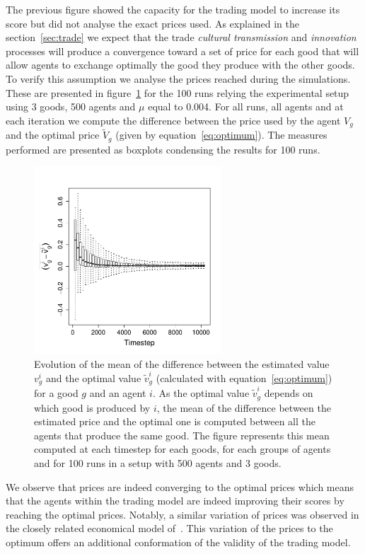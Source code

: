 \documentclass{wscpaperproc}
\begin{document}
The previous figure showed the capacity for the trading model to increase its score but did not analyse the exact prices used. As explained in the section~\ref{sec:trade} we expect that the trade \emph{cultural transmission} and \emph{innovation} processes will produce a convergence toward a set of price for each good that will allow agents to exchange optimally the good they produce with the other goods. To verify this assumption we analyse the prices reached during the simulations. These are presented in figure~\ref{fig:ratioEvol} for the 100 runs relying the experimental setup using 3 goods, 500 agents and $\mu$ equal to 0.004. For all runs, all agents and at each iteration we compute the difference between the price used by the agent $V_g$ and the optimal price $\tilde{V}_g$ (given by equation~\ref{eq:optimum}). The measures performed are presented as boxplots condensing the results for 100 runs.

\begin{figure}[!h]
	\begin{center}
		\includegraphics[width=7cm]{img/ClearingPriceDistanceEvolutionForTrade-G3N500.pdf}
	\end{center}
	\caption{Evolution of the mean of the difference between the estimated value $v^i_g$ and the optimal value $\tilde{v}^i_g$ (calculated with equation~\ref{eq:optimum}) for a good $g$ and an agent $i$. As the optimal value $\tilde{v}^i_g$ depends on which good is produced by $i$, the mean of the difference between the estimated price and the optimal one is computed between all the agents that produce the same good. The figure represents this mean computed at each timestep for each goods, for each groups of agents and for 100 runs in a setup with 500 agents and 3 goods. }
	\label{fig:ratioEvol}
\end{figure}

We observe that prices are indeed converging to the optimal prices which means that the agents within the trading model are indeed improving their scores by reaching the optimal prices. Notably, a similar variation of prices was observed in the closely related economical model of~\cite{gintis_emergence_2006}. This variation of the prices to the optimum offers an additional conformation of the validity of the trading model. 
\end{document}
